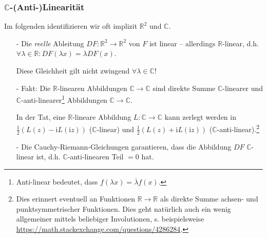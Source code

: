 \documentclass[10pt]{beamer}
\newcommand{\iu}{\mathrm{i}}
\begin{document}
\begin{frame}
	\frametitle{$\mathbb{C}$-(Anti-)Linearität}
	Im folgenden identifizieren wir oft implizit $\mathbb{R}^2$ und $\mathbb{C}$.
	\pause
	\begin{enumerate}
		\item[-] Die \emph{reelle} Ableitung $DF \colon \mathbb{R}^2 \to \mathbb{R}^2$ von $F$ ist linear -- allerdings $\mathbb{R}$-linear, d.h. $\forall \lambda \in \mathbb{R}: DF(\lambda x) = \lambda DF(x)$.
		      \pause

		      Diese Gleichheit gilt nicht zwingend $\forall \lambda \in \mathbb{C}$!
		      \pause
		\item[-] Fakt: Die $\mathbb{R}$-linearen Abbildungen $\mathbb{C} \to \mathbb{C}$ sind direkte Summe $\mathbb{C}$-linearer und $\mathbb{C}$-anti-linearer\footnote<4->{Anti-linear bedeutet, dass $f(\lambda x) = \overline{\lambda} f(x)$.} Abbildungen $\mathbb{C} \to \mathbb{C}$.
		      \pause

		      In der Tat, eine $\mathbb{R}$-lineare Abbildung $L \colon \mathbb{C} \to \mathbb{C}$ kann zerlegt werden in $\frac{1}{2}(L(z) - \iu L(\iu z))$ ($\mathbb{C}$-linear) und $\frac{1}{2}(L(z) + \iu L(\iu z))$ ($\mathbb{C}$-anti-linear).\footnote<5->{Dies erinnert eventuell an Funktionen $\mathbb{R} \to \mathbb{R}$ als direkte Summe achsen- und punktsymmetrischer Funktionen. Dies geht natürlich auch ein wenig allgemeiner mittels beliebiger Involutionen, s. beispielsweise \url{https://math.stackexchange.com/questions/4286284}.}
		      \pause
		\item[-] Die Cauchy-Riemann-Gleichungen garantieren, dass die Abbildung $D F$ $\mathbb{C}$-linear ist, d.h. $\mathbb{C}$-anti-linearen Teil $=0$ hat.
	\end{enumerate}
\end{frame}
\end{document}
